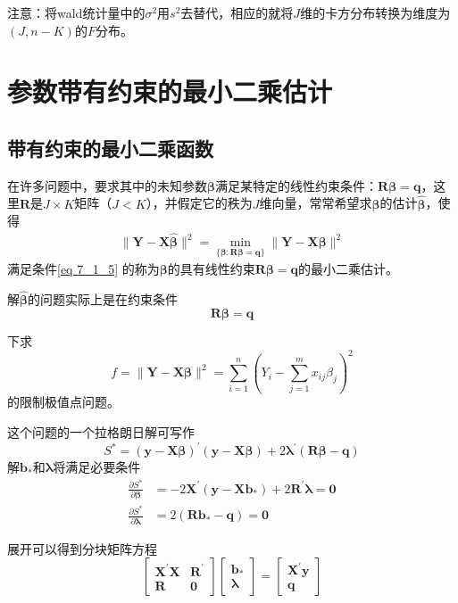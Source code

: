 	注意：将wald统计量中的$ \sigma^{2} $用$ s^{2} $去替代，相应的就将$ J $维的卡方分布转换为维度为$ \left ( J,n-K \right ) $的$ F $分布。
	
	\section{参数带有约束的最小二乘估计}
	\subsection{带有约束的最小二乘函数}
	在许多问题中，要求其中的未知参数$ \boldsymbol{\beta} $满足某特定的线性约束条件：$ \boldsymbol{R\beta}=\boldsymbol{q} $，这里$ \boldsymbol{R} $是$ J\times K $矩阵（$ J< K $），并假定它的秩为$ J $维向量，常常希望求$ \boldsymbol{\beta} $的估计$ \hat{\boldsymbol{\beta}} $，使得
	\begin{align}
		\|\boldsymbol{Y}-\boldsymbol{X} \hat{\boldsymbol{\beta}}\|^{2}=\min _{\{\boldsymbol{\beta}: \boldsymbol{R \beta}=\boldsymbol{q}\}}\|\boldsymbol{Y}-\boldsymbol{X \beta}\|^{2}
		\label{eq 7_2_1} 
	\end{align}
	满足条件\ref{eq 7_1_5} 的称为$ \boldsymbol{\beta} $的具有线性约束$ \boldsymbol{R\beta}=\boldsymbol{q} $的最小二乘估计。
	
	解$ \boldsymbol{\hat{\beta}} $的问题实际上是在约束条件
	$$ \boldsymbol{R\beta}=\boldsymbol{q} $$

	下求
	$$ f=\|\boldsymbol{Y}-\boldsymbol{X \beta}\|^{2}=\sum_{i=1}^{n}\left(Y_{i}-\sum_{j=1}^{m} x_{i j} \beta_{j}\right)^{2} $$
	的限制极值点问题。

	这个问题的一个拉格朗日解可写作
	$$ S^{*}=(\boldsymbol{y}-\boldsymbol{X \beta})^{\prime}(\boldsymbol{y}-\boldsymbol{X \beta})+2 \boldsymbol{\lambda}^{\prime}(\boldsymbol{R \beta}-\boldsymbol{q}) $$
	解$ \boldsymbol{b}_{*} $和$ \boldsymbol{\lambda} $将满足必要条件
	\vspace{-0.5em}
	\begin{align*}
		\frac{\partial S^{*}}{\partial \boldsymbol{\beta}} & =  -2 \boldsymbol{X}^{\prime}\left(\boldsymbol{y}-\boldsymbol{X}\boldsymbol{b}_{*}\right)+2 \boldsymbol{R}^{\prime} \boldsymbol{\lambda}=\boldsymbol{0} \\
		\frac{\partial S^{*}}{\partial \boldsymbol{\lambda}} & =  2\left(\boldsymbol{R} \boldsymbol{b}_{*}-\boldsymbol{q}\right)=\boldsymbol{0}
	\end{align*}

	展开可以得到分块矩阵方程
	\begin{equation}
		\left[\begin{array}{lll}
			\boldsymbol{X}^{\prime} \boldsymbol{X} & \boldsymbol{R}^{\prime}  \\
			\boldsymbol{R} & \boldsymbol{0}
		\end{array}\right]\left[\begin{array}{l}
			\boldsymbol{b}_{*} \\
			\boldsymbol{\lambda}
		\end{array}\right]=\left[\begin{array}{l}
			\boldsymbol{X}^{\prime} \boldsymbol{y} \\
			\boldsymbol{q}
		\end{array}\right]
	\end{equation}

